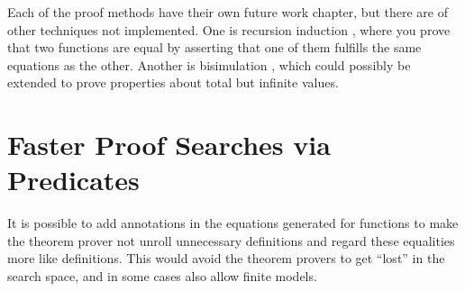 Each of the proof methods have their own future work chapter, but
there are of other techniques not implemented. One is recursion
induction \cite{recind}, where you prove that two functions are equal
by asserting that one of them fulfills the same equations as the
other. Another is bisimulation \cite{bisimulationCapretta}, which
could possibly be extended to prove properties about total but
infinite values.

\section{Faster Proof Searches via Predicates}

It is possible to add annotations in the equations generated for
functions to make the theorem prover not unroll unnecessary
definitions and regard these equalities more like definitions. This
would avoid the theorem provers to get ``lost'' in the search space,
and in some cases also allow finite models.
